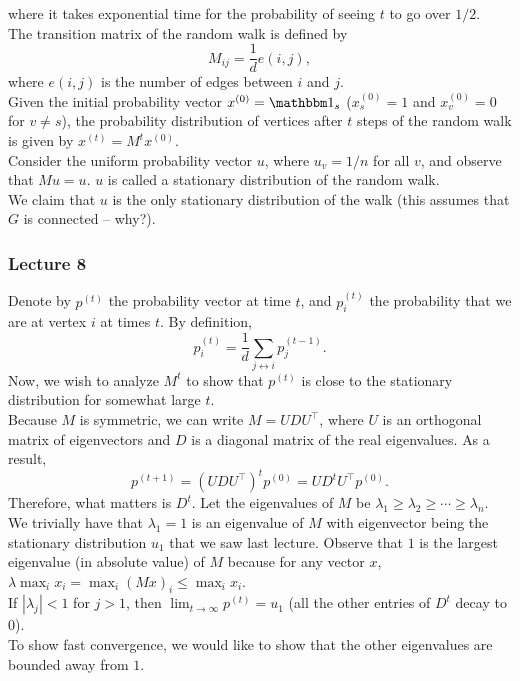 			where it takes exponential time for the probability of seeing $t$ to go over $1/2$.\\

			The transition matrix of the random walk is defined by
			\[ M_{ij} = \frac{1}{d}e(i,j), \]
			where $e(i,j)$ is the number of edges between $i$ and $j$.\\
			Given the initial probability vector $x^{(0)} = \indic_s$ ($x^{(0)}_s = 1$ and $x^{(0)}_v = 0$ for $v \ne s$), the probability distribution of vertices after $t$ steps of the random walk is given by $x^{(t)} = M^tx^{(0)}$.\\
			Consider the uniform probability vector $u$, where $u_v = 1/n$ for all $v$, and observe that $Mu = u$. $u$ is called a stationary distribution of the random walk.\\
			We claim that $u$ is the only stationary distribution of the walk (this assumes that $G$ is connected -- why?).


		\subsubsection{Lecture 8}


			Denote by $p^{(t)}$ the probability vector at time $t$, and $p_i^{(t)}$ the probability that we are at vertex $i$ at times $t$. By definition,
			\[ p_i^{(t)} = \frac{1}{d} \sum_{j \leftrightarrow i} p_j^{(t-1)}. \]
			Now, we wish to analyze $M^t$ to show that $p^{(t)}$ is close to the stationary distribution for somewhat large $t$.\\
			Because $M$ is symmetric, we can write $M = UDU^\top$, where $U$ is an orthogonal matrix of eigenvectors and $D$ is a diagonal matrix of the real eigenvalues.
			As a result,
			\[ p^{(t+1)} = (UDU^\top)^t p^{(0)} = UD^tU^\top p^{(0)}. \]
			Therefore, what matters is $D^t$. Let the eigenvalues of $M$ be $\lambda_1 \ge \lambda_2 \ge \cdots \ge \lambda_n$. \\
			We trivially have that $\lambda_1 = 1$ is an eigenvalue of $M$ with eigenvector being the stationary distribution $u_1$ that we saw last lecture. Observe that $1$ is the largest eigenvalue (in absolute value) of $M$ because for any vector $x$, $\lambda \max_i x_i = \max_i (Mx)_i \le \max_i x_i$.\\
			If $|\lambda_j| < 1$ for $j > 1$, then $\lim_{t \to \infty} p^{(t)} = u_1$ (all the other entries of $D^t$ decay to $0$).\\
			To show fast convergence, we would like to show that the other eigenvalues are bounded away from $1$.

